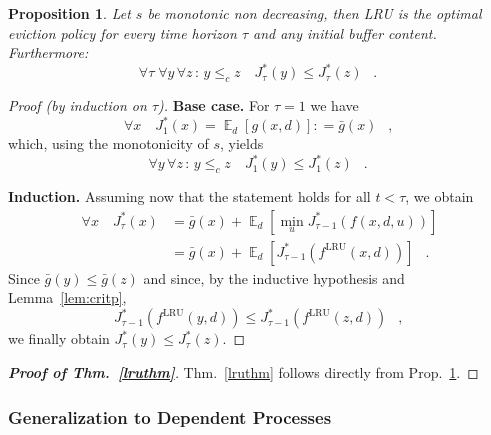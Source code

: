 \documentclass[11pt,a4paper]{article}
\DeclareMathOperator{\E}{\mathbb{E}}
\DeclareMathOperator{\lru}{LRU}
\DeclareMathOperator{\mf}{\enspace .}
\DeclareMathOperator{\mc}{\enspace ,}
\newcommand{\deq}{\mathrel{\mathop:}=}
\newtheorem{proposition}{Proposition}
\theoremstyle{definition}
\theoremstyle{remark}
\begin{document}
\begin{proposition}\label{lruthm2}
  Let $s$ be monotonic non decreasing, then LRU is the optimal eviction policy
  for every time horizon $\tau$ and any initial buffer content. Furthermore:
  \begin{equation}
    \forall \tau \; \forall y \, \forall z \, :\, y \leq_c z \quad
    J^*_\tau(y)\leq J^*_\tau(z) \mf
  \end{equation}
\end{proposition}
\begin{proof}[Proof (by induction on $\tau$)]
  \par{\bf Base case.} For $\tau=1$ we have
  \begin{equation}
    \forall x \quad J^*_1(x)=\E_d\left[g(x,d)\right] \deq \bar g (x) \mc
  \end{equation}
  which, using the monotonicity of $s$, yields
  \begin{equation}
    \forall y \, \forall z \, :\, y \leq_c z \quad J^*_1(y)\leq
    J^*_1(z) \mf
  \end{equation}
\noindent \par{\bf Induction.} Assuming now that the statement holds for all 
$t < \tau$, we obtain
  \begin{equation}
    \begin{split}
      \forall x \quad J^*_\tau(x)&=\bar g(x) + \E_d\left[\min_u
        J^*_{\tau-1}\left(f(x,d,u)\right)\right]\\
      &=\bar g(x) + \E_d\left[J^*_{\tau-1}\left(f^{\lru}(x,d)\right)\right]\mf
    \end{split}
  \end{equation}
  Since $\bar g(y)\leq \bar g(z)$ and since, by the inductive hypothesis and
  Lemma~\ref{lem:critp},
  \begin{equation}
    J^*_{\tau-1}\left(f^{\lru}(y,d)\right)
    \leq J^*_{\tau-1}\left(f^{\lru}(z,d)\right) \mc
  \end{equation}
  we finally obtain $J^*_\tau(y) \leq J^*_\tau(z)$.
\end{proof}
\begin{proof}[{\bf Proof of Thm.~\ref{lruthm}}]
  Thm.~\ref{lruthm} follows directly from Prop.~\ref{lruthm2}.
\end{proof}

\subsubsection{Generalization to Dependent Processes}
\label{sec:gener-depend-proc-lru}
\end{document}
